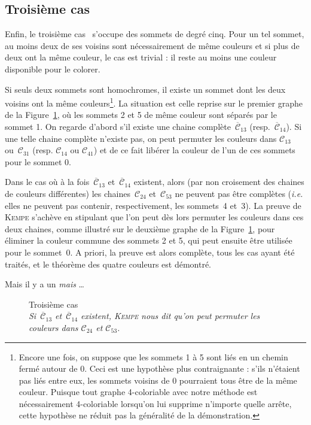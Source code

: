 \documentclass[french]{report}
\begin{document}
\subsection*{Troisième cas}

Enfin, le troisième cas~\label{pg:Troisième} s'occupe des sommets de degré cinq. Pour un tel sommet, au moins deux de ses voisins sont nécessairement de même couleurs et si plus de deux ont la même couleur, le cas est trivial : il reste au moins une couleur disponible pour le colorer.

Si seuls deux sommets sont homochromes, il existe un sommet dont les deux voisins ont la même couleurs\footnote{Encore une fois, on suppose que les sommets 1 à 5 sont liés en un chemin fermé autour de 0. Ceci est une hypothèse plus contraignante : s'ils n'étaient pas liés entre eux, les sommets voisins de 0 pourraient tous être de la même couleur. Puisque tout graphe 4-coloriable avec notre méthode est nécessairement 4-coloriable lorsqu'on lui supprime n'importe quelle arrête, cette hypothèse ne réduit pas la généralité de la démonstration.}. La situation est celle reprise sur le premier graphe de la Figure~\ref{fig:Troisième}, où les sommets 2 et 5 de même couleur sont séparés par le sommet 1. On regarde d'abord s'il existe une chaine complète~$\overline{\mathcal{C}}_{13}$ (resp.~$\overline{\mathcal{C}}_{14}$). Si une telle chaine complète n'existe pas, on peut permuter les couleurs dans $\mathcal{C}_{13}$ ou~$\mathcal{C}_{31}$ (resp. $\mathcal{C}_{14}$ ou $\mathcal{C}_{41}$) et de ce fait libérer la couleur de l'un de ces sommets pour le sommet 0.

Dans le cas où à la fois~$\overline{\mathcal{C}}_{13}$ et~$\overline{\mathcal{C}}_{14}$ existent, alors (par non croisement des chaines de couleurs différentes) les chaines~$\mathcal{C}_{24}$ et~$\mathcal{C}_{53}$ ne peuvent pas être complètes (\textit{i.e.} elles ne peuvent pas contenir, respectivement, les sommets~4 et~3). La preuve de \textsc{Kempe} s'achève en stipulant que l'on peut dès lors permuter les couleurs dans ces deux chaines, comme illustré sur le deuxième graphe de la Figure~\ref{fig:Troisième}, pour éliminer la couleur commune des sommets 2 et 5, qui peut ensuite être utilisée pour le sommet~0. A priori, la preuve est alors complète, tous les cas ayant été traités, et le théorème des quatre couleurs est démontré.

Mais il y a un \textit{mais} …

\begin{figure}[h!]\centering
\begin{changemargin}{-3cm}{-3cm}
\begin{center}


\caption{Troisième cas\\ \footnotesize\textit{Si~$\overline{\mathcal{C}}_{13}$ et~$\overline{\mathcal{C}}_{14}$ existent, \textsc{Kempe} nous dit qu'on peut permuter les couleurs dans $\mathcal{C}_{24}$ et $\mathcal{C}_{53}$.}}\label{fig:Troisième}
\end{center}
\end{changemargin}
\end{figure}
\end{document}

